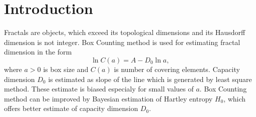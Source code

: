 
\section {Introduction }
Fractals are objects, which exceed its topological dimensions and its Hausdorff dimension is not integer. Box Counting method is used for estimating fractal dimension in the form
\begin{equation} 
\label{eq:boxcount}
\ln{C(a)} = A - D_{0}\ln{a},
\end{equation}
where $a>0$ is box size and $C(a)$ is number of covering elements. Capacity dimension $D_{0}$ is estimated as slope of the line which is generated by least square method. These estimate is biased especialy for small values of $a$. Box Counting method can be improved by Bayesian estimation of Hartley entropy $H_{0}$, which offers better estimate of capacity dimension $D_{0}$.